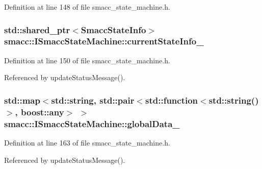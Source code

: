Definition at line 148 of file smacc\+\_\+state\+\_\+machine.\+h.

\subsubsection[{\texorpdfstring{current\+State\+Info\+\_\+}{currentStateInfo_}}]{\setlength{\rightskip}{0pt plus 5cm}std\+::shared\+\_\+ptr$<${\bf Smacc\+State\+Info}$>$ smacc\+::\+I\+Smacc\+State\+Machine\+::current\+State\+Info\+\_\+\hspace{0.3cm}{\ttfamily [protected]}}\hypertarget{classsmacc_1_1ISmaccStateMachine_a95e42f735cecdc231ad5372bf9fe7eaf}{}\label{classsmacc_1_1ISmaccStateMachine_a95e42f735cecdc231ad5372bf9fe7eaf}


Definition at line 150 of file smacc\+\_\+state\+\_\+machine.\+h.



Referenced by update\+Status\+Message().

\subsubsection[{\texorpdfstring{global\+Data\+\_\+}{globalData_}}]{\setlength{\rightskip}{0pt plus 5cm}std\+::map$<$std\+::string, std\+::pair$<$std\+::function$<$std\+::string()$>$, boost\+::any$>$ $>$ smacc\+::\+I\+Smacc\+State\+Machine\+::global\+Data\+\_\+\hspace{0.3cm}{\ttfamily [private]}}\hypertarget{classsmacc_1_1ISmaccStateMachine_ad2f9dae184ea942db632ac4532a10a91}{}\label{classsmacc_1_1ISmaccStateMachine_ad2f9dae184ea942db632ac4532a10a91}


Definition at line 163 of file smacc\+\_\+state\+\_\+machine.\+h.



Referenced by update\+Status\+Message().

